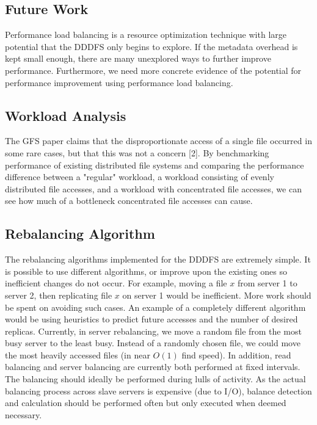\documentclass[twoside]{article}
\begin{document}
\begin{multicols}{2}
\section{Future Work}
Performance load balancing is a resource optimization technique with large potential that the DDDFS only begins to explore. If the metadata overhead is kept small enough, there are many unexplored ways to further improve performance. Furthermore, we need more concrete evidence of the potential for performance improvement using performance load balancing.

\subsection*{Workload Analysis}
The GFS paper claims that the disproportionate access of a single file occurred in some rare cases, but that this was not a concern [2]. By benchmarking performance of existing distributed file systems and comparing the performance difference between a "regular" workload, a workload consisting of evenly distributed file accesses, and a workload with concentrated file accesses, we can see how much of a bottleneck concentrated file accesses can cause.

\subsection*{Rebalancing Algorithm}
The rebalancing algorithms implemented for the DDDFS are extremely simple. It is possible to use different algorithms, or improve upon the existing ones so inefficient changes do not occur. For example, moving a file $x$ from server 1 to server 2, then replicating file $x$ on server 1 would be inefficient. More work should be spent on avoiding such cases. An example of a completely different algorithm would be using heuristics to predict future accesses and the number of desired replicas. Currently, in server rebalancing, we move a random file from the most busy server to the least busy. Instead of a randomly chosen file, we could move the most heavily accessed files (in near $O(1)$ find speed). In addition, read balancing and server balancing are currently both performed at fixed intervals. The balancing should ideally be performed during lulls of activity. As the actual balancing process across slave servers is expensive (due to I/O), balance detection and calculation should be performed often but only executed when deemed necessary.


\end{multicols}
\end{document}
